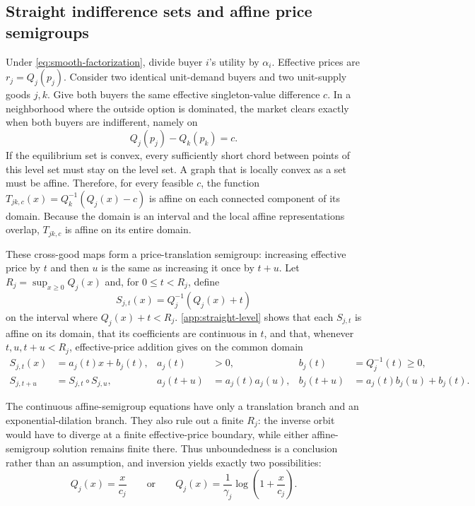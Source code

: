 \subsection{Straight indifference sets and affine price semigroups}

Under \eqref{eq:smooth-factorization}, divide buyer $i$'s utility by $\alpha_i$. Effective prices are $r_j=Q_j(p_j)$. Consider two identical unit-demand buyers and two unit-supply goods $j,k$. Give both buyers the same effective singleton-value difference $c$. In a neighborhood where the outside option is dominated, the market clears exactly when both buyers are indifferent, namely on
\begin{equation}\label{eq:level-set}
Q_j(p_j)-Q_k(p_k)=c.
\end{equation}
If the equilibrium set is convex, every sufficiently short chord between points of this level set must stay on the level set. A graph that is locally convex as a set must be affine. Therefore, for every feasible $c$, the function $T_{jk,c}(x)=Q_k^{-1}(Q_j(x)-c)$ is affine on each connected component of its domain. Because the domain is an interval and the local affine representations overlap, $T_{jk,c}$ is affine on its entire domain.

These cross-good maps form a price-translation semigroup: increasing effective price by $t$ and then $u$ is the same as increasing it once by $t+u$. Let $R_j=\sup_{x\ge0}Q_j(x)$ and, for $0\le t<R_j$, define
\begin{equation}\label{eq:translation-semigroup}
S_{j,t}(x)=Q_j^{-1}(Q_j(x)+t)
\end{equation}
on the interval where $Q_j(x)+t<R_j$. \ref{app:straight-level} shows that each $S_{j,t}$ is affine on its domain, that its coefficients are continuous in $t$, and that, whenever $t,u,t+u<R_j$, effective-price addition gives on the common domain
\begin{equation}\label{eq:semigroup-identities}
\begin{aligned}
S_{j,t}(x)&=a_j(t)x+b_j(t),
&a_j(t)&>0,
&b_j(t)&=Q_j^{-1}(t)\ge0,\\
S_{j,t+u}&=S_{j,t}\circ S_{j,u},
&a_j(t+u)&=a_j(t)a_j(u),
&b_j(t+u)&=a_j(t)b_j(u)+b_j(t).
\end{aligned}
\end{equation}

The continuous affine-semigroup equations have only a translation branch and an exponential-dilation branch. They also rule out a finite $R_j$: the inverse orbit would have to diverge at a finite effective-price boundary, while either affine-semigroup solution remains finite there. Thus unboundedness is a conclusion rather than an assumption, and inversion yields exactly two possibilities:
\begin{equation}\label{eq:inverse-two-forms}
Q_j(x)=\frac{x}{c_j}
\qquad\text{or}\qquad
Q_j(x)=\frac{1}{\gamma_j}\log\left(1+\frac{x}{c_j}\right).
\end{equation}

